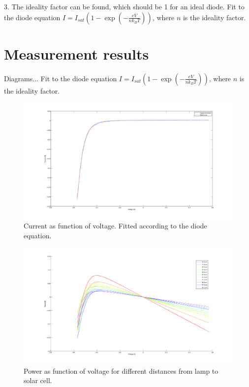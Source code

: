\documentclass[a4paper]{article}
\begin{document}
3. The ideality factor can be found, which should be 1 for an ideal diode. Fit to the diode equation $I = I_{sat}\left(1-\exp\left(-\frac{eV}{nk_BT}\right)\right)$, where $n$ is the ideality factor.

\section{Measurement results}

Diagrams... Fit to the diode equation $I = I_{sat}\left(1-\exp\left(-\frac{eV}{nk_BT}\right)\right)$, where $n$ is the ideality factor.

\begin{figure}[h!]
  \label{ivsun}
  \begin{center}
    \includegraphics[scale=0.2]{IvsUnoIlumination.jpg}
  \end{center}
  \caption{Current as function of voltage. Fitted according to the diode equation.}
\end{figure}
\begin{figure}[h!]
  \label{pvsv}
  \begin{center}
    \includegraphics[scale=0.2]{PvsV.jpg}
  \end{center}
  \caption{Power as function of voltage for different distances from lamp to solar cell.}
\end{figure}
\end{document}
